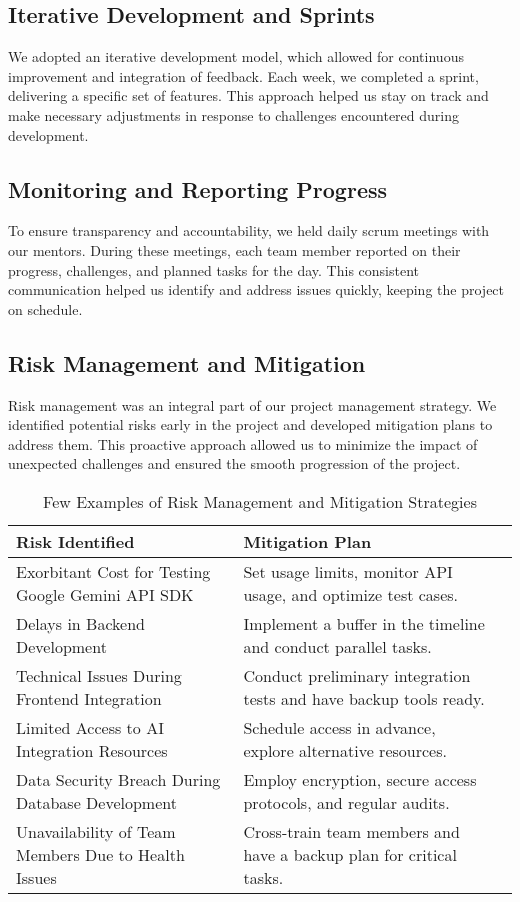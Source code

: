 \subsection{Iterative Development and Sprints}
We adopted an iterative development model, which allowed for continuous improvement and integration of feedback. Each week, we completed a sprint, delivering a specific set of features. This approach helped us stay on track and make necessary adjustments in response to challenges encountered during development.

\subsection{Monitoring and Reporting Progress}
To ensure transparency and accountability, we held daily scrum meetings with our mentors. During these meetings, each team member reported on their progress, challenges, and planned tasks for the day. This consistent communication helped us identify and address issues quickly, keeping the project on schedule.

\subsection{Risk Management and Mitigation}
Risk management was an integral part of our project management strategy. We identified potential risks early in the project and developed mitigation plans to address them. This proactive approach allowed us to minimize the impact of unexpected challenges and ensured the smooth progression of the project.

\begin{table}[h!]
\centering
\begin{tabular}{|l|l|l|}
\hline
\textbf{Risk Identified}                             & \textbf{Mitigation Plan}                                                \\ \hline
Exorbitant Cost for Testing Google Gemini API SDK    & Set usage limits, monitor API usage, and optimize test cases.           \\ \hline
Delays in Backend Development                        & Implement a buffer in the timeline and conduct parallel tasks.          \\ \hline
Technical Issues During Frontend Integration         & Conduct preliminary integration tests and have backup tools ready.      \\ \hline
Limited Access to AI Integration Resources           & Schedule access in advance, explore alternative resources.              \\ \hline
Data Security Breach During Database Development     & Employ encryption, secure access protocols, and regular audits.         \\ \hline
Unavailability of Team Members Due to Health Issues  & Cross-train team members and have a backup plan for critical tasks.     \\ \hline
\end{tabular}
\caption{Few Examples of Risk Management and Mitigation Strategies}
\label{tab:risk_management}
\end{table}
